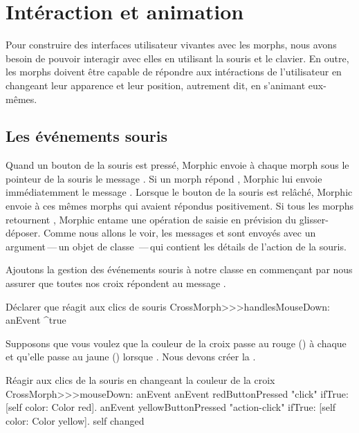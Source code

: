 \documentclass[a4paper,10pt,twoside]{book}
\begin{document}
\section{Intéraction et animation}

Pour construire des interfaces utilisateur vivantes avec les morphs,
nous avons besoin de pouvoir interagir avec elles en utilisant la
souris et le clavier.
En outre, les morphs doivent être capable de répondre aux
intéractions de l'utilisateur en changeant leur apparence et leur
position, autrement dit, en s'animant eux-mêmes.

\subsection{Les événements souris}

Quand un bouton de la souris est pressé, Morphic envoie à chaque
morph sous le pointeur de la souris le message
. Si un morph répond , Morphic lui
envoie immédiatemment le message . Lorsque
le bouton de la souris est relâché, Morphic envoie
  à ces mêmes morphs qui avaient répondus
positivement. Si tous les morphs retournent , Morphic entame
une opération de
saisie en prévision du glisser-déposer.
Comme nous allons le voir, les messages  et 
sont envoyés avec un argument\,---\,un objet de classe
\,---\,qui contient les détails de l'action de la souris.

Ajoutons la gestion des événements souris à notre classe
 en commençant par nous assurer que toutes nos
croix répondent  au message .

\begin{method}{Déclarer que  réagit aux clics de souris}
CrossMorph>>>handlesMouseDown: anEvent
	^true
\end{method}

Supposons que vous voulez que la couleur de la croix passe au rouge
()
à chaque  et qu'elle passe au jaune
()
lorsque . 
Nous devons créer la .

\begin{method}[mouseDown]{Réagir aux clics de la souris en changeant la couleur de la croix}
CrossMorph>>>mouseDown: anEvent
	anEvent redButtonPressed "click"
		ifTrue: [self color: Color red].
	anEvent yellowButtonPressed "action-click"
		ifTrue: [self color: Color yellow].
	self changed
\end{method}
\end{document}
